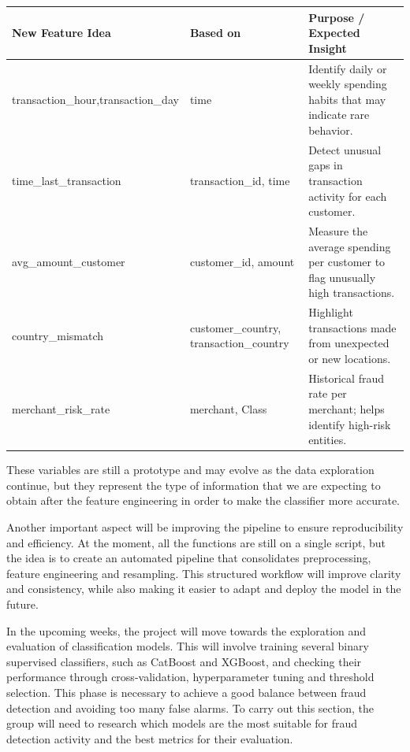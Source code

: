 \documentclass[12pt]{report} %
\begin{document}
\begin{table}[ht]
\centering
\begin{tabular}{|p{4cm}|p{4cm}|p{7cm}|}
\hline
\textbf{New Feature Idea} & \textbf{Based on} & \textbf{Purpose / Expected Insight} \\
\hline
transaction\_hour,\newline transaction\_day & time & Identify daily or weekly spending habits that may indicate rare behavior.\\
\hline
time\_last\_transaction& transaction\_id, time & Detect unusual gaps in transaction activity for each customer.\\
\hline
avg\_amount\_customer& customer\_id, amount & Measure the average spending per customer to flag unusually high transactions. \\
\hline
country\_mismatch & customer\_country, transaction\_country & Highlight transactions made from unexpected or new locations. \\
\hline
merchant\_risk\_rate & merchant, Class & Historical fraud rate per merchant; helps identify high-risk entities. \\
\hline
\end{tabular}

\end{table}


These variables are still a prototype and may evolve as the data exploration continue, but they represent the type of information that we are expecting to obtain after the feature engineering in order to make the classifier more accurate.

Another important aspect will be improving the pipeline to ensure reproducibility and efficiency. At the moment, all the functions are still on a single script, but the idea is to create an automated pipeline that consolidates preprocessing, feature engineering and resampling. This structured workflow will improve clarity and consistency, while also making it easier to adapt and deploy the model in the future.

In the upcoming weeks, the project will move towards the exploration and evaluation of classification models. This will involve training several binary supervised classifiers, such as CatBoost and XGBoost, and checking their performance through cross-validation, hyperparameter tuning and threshold selection. This phase is necessary to achieve a good balance between fraud detection and avoiding too many false alarms. To carry out this section, the group will need to research which models are the most suitable for fraud detection activity and the best metrics for their evaluation.
\end{document}
